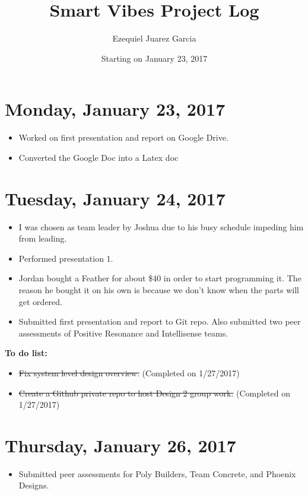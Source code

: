 \documentclass[12pt]{article}
\begin{document}
\title{Smart Vibes Project Log}
\author{Ezequiel Juarez Garcia}
\date{Starting on January 23, 2017}
\maketitle

\newpage

\section{Monday, January 23, 2017}
\begin{itemize}
\item Worked on first presentation and report on Google Drive.
\item Converted the Google Doc into a Latex doc
\end{itemize}

\section{Tuesday, January 24, 2017}
\begin{itemize}
\item I was chosen as team leader by Joshua due to his busy schedule impeding him from leading.
\item Performed presentation 1.
\item Jordan bought a Feather for about \$40 in order to start programming it. The reason he bought it on his own is because we don't know when the parts will get ordered.
\item Submitted first presentation and report to Git repo. Also submitted two peer assessments of Positive Resonance and Intellisense teams.
\end{itemize}

\textbf{To do list:}
\begin{itemize}
\item \sout{Fix system level design overview.} (Completed on 1/27/2017)
\item \sout{Create a Github private repo to host Design 2 group work.} (Completed on 1/27/2017)
\end{itemize}

\section{Thursday, January 26, 2017}
\begin{itemize}
\item Submitted peer assessments for Poly Builders, Team Concrete, and Phoenix Designs.
\end{itemize}
\end{document}
